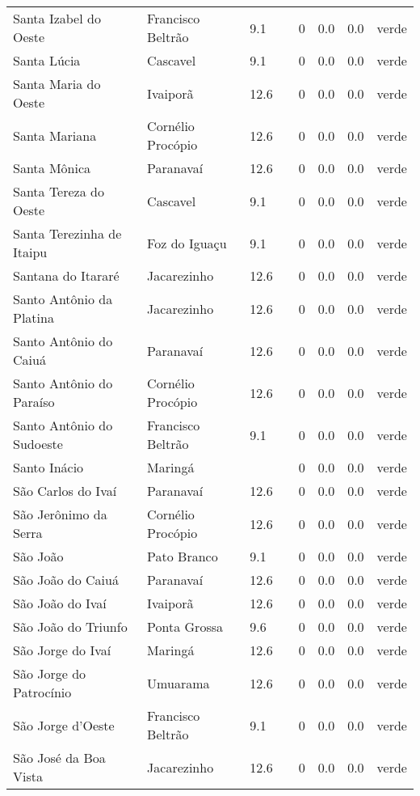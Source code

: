 \begin{longtable}{l|lllllll}
  Santa Izabel do Oeste & Francisco Beltrão & 9.1 &  & 0 & 0.0 & 0.0 & verde \\ 
  Santa Lúcia & Cascavel & 9.1 &  & 0 & 0.0 & 0.0 & verde \\ 
  Santa Maria do Oeste & Ivaiporã & 12.6 &  & 0 & 0.0 & 0.0 & verde \\ 
  Santa Mariana & Cornélio Procópio & 12.6 &  & 0 & 0.0 & 0.0 & verde \\ 
  Santa Mônica & Paranavaí & 12.6 &  & 0 & 0.0 & 0.0 & verde \\ 
  Santa Tereza do Oeste & Cascavel & 9.1 &  & 0 & 0.0 & 0.0 & verde \\ 
  Santa Terezinha de Itaipu & Foz do Iguaçu & 9.1 &  & 0 & 0.0 & 0.0 & verde \\ 
  Santana do Itararé & Jacarezinho & 12.6 &  & 0 & 0.0 & 0.0 & verde \\ 
  Santo Antônio da Platina & Jacarezinho & 12.6 &  & 0 & 0.0 & 0.0 & verde \\ 
  Santo Antônio do Caiuá & Paranavaí & 12.6 &  & 0 & 0.0 & 0.0 & verde \\ 
  Santo Antônio do Paraíso & Cornélio Procópio & 12.6 &  & 0 & 0.0 & 0.0 & verde \\ 
  Santo Antônio do Sudoeste & Francisco Beltrão & 9.1 &  & 0 & 0.0 & 0.0 & verde \\ 
  Santo Inácio & Maringá &  &  & 0 & 0.0 & 0.0 & verde \\ 
  São Carlos do Ivaí & Paranavaí & 12.6 &  & 0 & 0.0 & 0.0 & verde \\ 
  São Jerônimo da Serra & Cornélio Procópio & 12.6 &  & 0 & 0.0 & 0.0 & verde \\ 
  São João & Pato Branco & 9.1 &  & 0 & 0.0 & 0.0 & verde \\ 
  São João do Caiuá & Paranavaí & 12.6 &  & 0 & 0.0 & 0.0 & verde \\ 
  São João do Ivaí & Ivaiporã & 12.6 &  & 0 & 0.0 & 0.0 & verde \\ 
  São João do Triunfo & Ponta Grossa & 9.6 &  & 0 & 0.0 & 0.0 & verde \\ 
  São Jorge do Ivaí & Maringá & 12.6 &  & 0 & 0.0 & 0.0 & verde \\ 
  São Jorge do Patrocínio & Umuarama & 12.6 &  & 0 & 0.0 & 0.0 & verde \\ 
  São Jorge d'Oeste & Francisco Beltrão & 9.1 &  & 0 & 0.0 & 0.0 & verde \\ 
  São José da Boa Vista & Jacarezinho & 12.6 &  & 0 & 0.0 & 0.0 & verde \\ 

\end{longtable}
